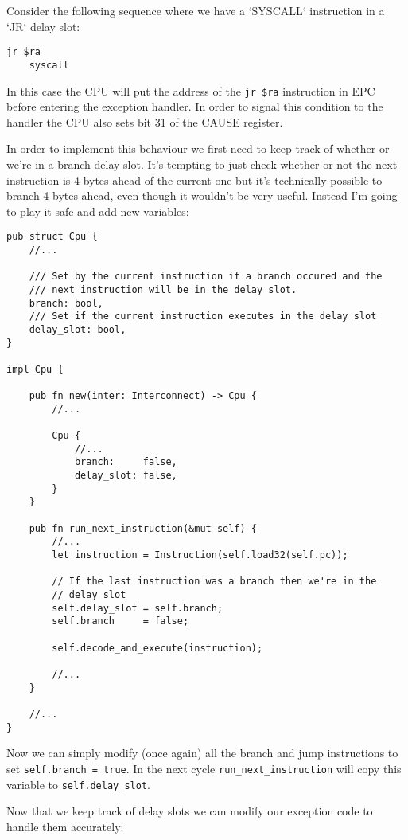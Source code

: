 \documentclass[a4paper]{article}
\newcommand{\code}[1] {\texttt{#1}}
\begin{document}
Consider the following sequence where we have a `SYSCALL` instruction
in a `JR` delay slot:

\begin{lstlisting}[language=assembly]
    jr $ra
    syscall
\end{lstlisting}

In this case the CPU will put the address of the \code{jr \$ra}
instruction in EPC before entering the exception handler. In order to
signal this condition to the handler the CPU also sets bit 31 of the
CAUSE register.

In order to implement this behaviour we first need to keep track of
whether or we're in a branch delay slot. It's tempting to just check
whether or not the next instruction is 4 bytes ahead of the current
one but it's technically possible to branch 4 bytes ahead, even though
it wouldn't be very useful. Instead I'm going to play it safe and add
new variables:

\begin{lstlisting}
pub struct Cpu {
    //...

    /// Set by the current instruction if a branch occured and the
    /// next instruction will be in the delay slot.
    branch: bool,
    /// Set if the current instruction executes in the delay slot
    delay_slot: bool,
}

impl Cpu {

    pub fn new(inter: Interconnect) -> Cpu {
        //...

        Cpu {
            //...
            branch:     false,
            delay_slot: false,
        }
    }

    pub fn run_next_instruction(&mut self) {
        //...
        let instruction = Instruction(self.load32(self.pc));

        // If the last instruction was a branch then we're in the
        // delay slot
        self.delay_slot = self.branch;
        self.branch     = false;

        self.decode_and_execute(instruction);

        //...
    }

    //...
}
\end{lstlisting}

Now we can simply modify (once again) all the branch and jump
instructions to set \code{self.branch = true}. In the next cycle
\code{run\_next\_instruction} will copy this variable to
\code{self.delay\_slot}.

Now that we keep track of delay slots we can modify our exception code
to handle them accurately:
\end{document}
